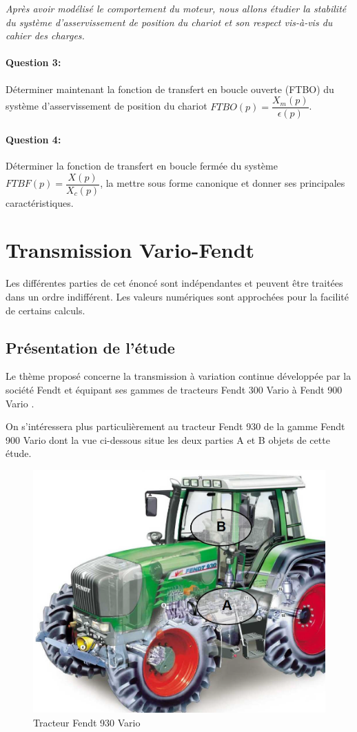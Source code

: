 \textit{Après avoir modélisé le comportement du moteur, nous allons étudier la stabilité du système d'asservissement de position du chariot et son respect vis-à-vis du cahier des charges.}

\paragraph{Question 3:} Déterminer maintenant la fonction de transfert en boucle ouverte (FTBO) du système d'asservissement de position du chariot $FTBO(p)=\dfrac{X_m(p)}{\epsilon(p)}$.

\paragraph{Question 4:} Déterminer la fonction de transfert en boucle fermée du système $FTBF(p)=\dfrac{X(p)}{X_c(p)}$, la mettre sous forme canonique et donner ses principales caractéristiques.

\newpage

\section{Transmission Vario-Fendt}

Les différentes parties de cet énoncé sont indépendantes et peuvent être traitées dans un ordre indifférent. Les valeurs numériques sont approchées pour la facilité de certains calculs.

\subsection{Présentation de l'étude}

Le thème proposé concerne la transmission à variation continue développée par la société Fendt et équipant ses gammes de tracteurs \og Fendt 300 Vario \fg à \og Fendt 900 Vario \fg.

On s'intéressera plus particulièrement au tracteur Fendt 930 de la gamme \og Fendt 900 Vario \fg dont la vue ci-dessous situe les deux parties A et B objets de cette étude.

\begin{figure}[!h]
\centering\includegraphics[width=0.7\linewidth]{img/Tracteur1.png}
\caption{Tracteur Fendt 930 Vario}
\label{fig1}
\end{figure}

